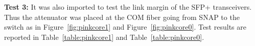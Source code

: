 \documentclass{article}
\begin{document}
\clearpage
\textbf{Test 3:}
It was also imported to test the link margin of the SFP+ transceivers. Thus the attenuator was placed at the COM fiber going from SNAP to the switch as in Figure~\ref{fig:pinkcore1} and Figure~\ref{fig:pinkcore0}. Test results are reported in Table~\ref{table:pinkcore1} and Table~\ref{table:pinkcore0}.
\end{document}
